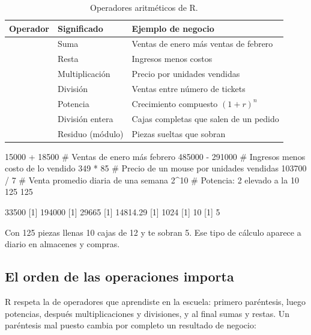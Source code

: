 \begin{table}[H]
\centering
\small
\caption{Operadores aritméticos de R.}
\label{tab:m1-operadores}
\begin{tabularx}{\textwidth}{l l X}
\toprule
\textbf{Operador} & \textbf{Significado} & \textbf{Ejemplo de negocio} \\
\midrule
\codigo{+} & Suma & Ventas de enero más ventas de febrero \\
\codigo{-} & Resta & Ingresos menos costos \\
\codigo{*} & Multiplicación & Precio por unidades vendidas \\
\codigo{/} & División & Ventas entre número de tickets \\
\codigo{\textasciicircum} & Potencia & Crecimiento compuesto $(1 + r)^n$ \\
\codigo{\%/\%} & División entera & Cajas completas que salen de un pedido \\
\codigo{\%\%} & Residuo (módulo) & Piezas sueltas que sobran \\
\bottomrule
\end{tabularx}
\end{table}

\begin{rcode}
15000 + 18500      # Ventas de enero más febrero
485000 - 291000    # Ingresos menos costo de lo vendido
349 * 85           # Precio de un mouse por unidades vendidas
103700 / 7         # Venta promedio diaria de una semana
2^10               # Potencia: 2 elevado a la 10
125 %
125 %
\end{rcode}
\begin{rsalida}
[1] 33500
[1] 194000
[1] 29665
[1] 14814.29
[1] 1024
[1] 10
[1] 5
\end{rsalida}

Con 125 piezas llenas 10 cajas de 12 y te sobran 5. Ese tipo de cálculo
aparece a diario en almacenes y compras.

\subsection{El orden de las operaciones importa}

R respeta la  de operadores que aprendiste en la
escuela: primero paréntesis, luego potencias, después multiplicaciones y
divisiones, y al final sumas y restas. Un paréntesis mal puesto cambia por
completo un resultado de negocio:

